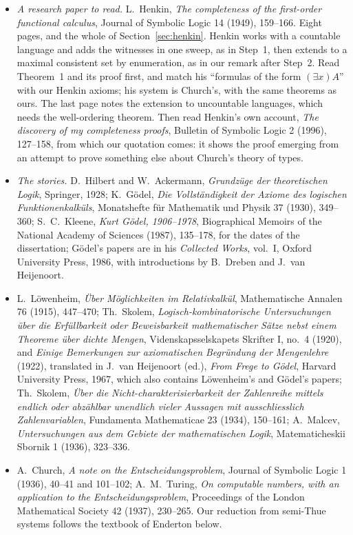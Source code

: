 \begin{itemize}
\item \emph{A research paper to read.} L.~Henkin, \emph{The completeness of the first-order functional calculus}, Journal of Symbolic Logic 14 (1949), 159--166. Eight pages, and the whole of Section~\ref{sec:henkin}. Henkin works with a countable language and adds the witnesses in one sweep, as in Step~1, then extends to a maximal consistent set by enumeration, as in our remark after Step~2. Read Theorem~1 and its proof first, and match his ``formulas of the form $(\exists x)A$'' with our Henkin axioms; his system is Church's, with the same theorems as ours. The last page notes the extension to uncountable languages, which needs the well-ordering theorem. Then read Henkin's own account, \emph{The discovery of my completeness proofs}, Bulletin of Symbolic Logic 2 (1996), 127--158, from which our quotation comes: it shows the proof emerging from an attempt to prove something else about Church's theory of types.
\item \emph{The stories.} D.~Hilbert and W.~Ackermann, \emph{Grundzüge der theoretischen Logik}, Springer, 1928; K.~Gödel, \emph{Die Vollständigkeit der Axiome des logischen Funktionenkalküls}, Monatshefte für Mathematik und Physik 37 (1930), 349--360; S.~C.~Kleene, \emph{Kurt Gödel, 1906--1978}, Biographical Memoirs of the National Academy of Sciences (1987), 135--178, for the dates of the dissertation; Gödel's papers are in his \emph{Collected Works}, vol.~I, Oxford University Press, 1986, with introductions by B.~Dreben and J.~van Heijenoort.
\item L.~Löwenheim, \emph{Über Möglichkeiten im Relativkalkül}, Mathematische Annalen 76 (1915), 447--470; Th.~Skolem, \emph{Logisch-kombinatorische Untersuchungen über die Erfüllbarkeit oder Beweisbarkeit mathematischer Sätze nebst einem Theoreme über dichte Mengen}, Videnskapsselskapets Skrifter I, no.~4 (1920), and \emph{Einige Bemerkungen zur axiomatischen Begründung der Mengenlehre} (1922), translated in J.~van Heijenoort (ed.), \emph{From Frege to Gödel}, Harvard University Press, 1967, which also contains Löwenheim's and Gödel's papers; Th.~Skolem, \emph{Über die Nicht-charakterisierbarkeit der Zahlenreihe mittels endlich oder abzählbar unendlich vieler Aussagen mit ausschliesslich Zahlenvariablen}, Fundamenta Mathematicae 23 (1934), 150--161; A.~Malcev, \emph{Untersuchungen aus dem Gebiete der mathematischen Logik}, Matematicheskii Sbornik 1 (1936), 323--336.
\item A.~Church, \emph{A note on the Entscheidungsproblem}, Journal of Symbolic Logic 1 (1936), 40--41 and 101--102; A.~M.~Turing, \emph{On computable numbers, with an application to the Entscheidungsproblem}, Proceedings of the London Mathematical Society 42 (1937), 230--265. Our reduction from semi-Thue systems follows the textbook of Enderton below.

\end{itemize}
